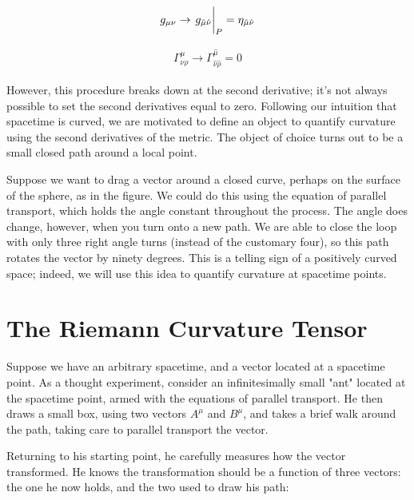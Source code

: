 \documentclass[10pt]{article}
\begin{document}
\begin{align}
    g_{\mu \nu} \rightarrow \eval{g_{\hat{\mu} \hat{\nu}}}_P = \eta_{\hat{\mu}\hat{\nu}}
\end{align}

\begin{align}
    \Gamma^{\mu}_{\nu \rho} \rightarrow \Gamma^{\hat{\mu}}_{\hat{\nu}\hat{\rho}} = 0
\end{align}

However, this procedure breaks down at the second derivative; it's not always possible to set the second derivatives equal to zero. Following our intuition that spacetime is curved, we are motivated to define an object to quantify curvature using the second derivatives of the metric. The object of choice turns out to be a small closed path around a local point.

Suppose we want to drag a vector around a closed curve, perhaps on the surface of the sphere, as in the figure. We could do this using the equation of parallel transport, which holds the angle constant throughout the process. The angle does change, however, when you turn onto a new path. We are able to close the loop with only three right angle turns (instead of the customary four), so this path rotates the vector by ninety degrees. This is a telling sign of a positively curved space; indeed, we will use this idea to quantify curvature at spacetime points.

\section{The Riemann Curvature Tensor}

Suppose we have an arbitrary spacetime, and a vector located at a spacetime point. As a thought experiment, consider an infinitesimally small "ant" located at the spacetime point, armed with the equations of parallel transport. He then draws a small box, using two vectors $A^\mu$ and $B^\mu$, and takes a brief walk around the path, taking care to parallel transport the vector.

Returning to his starting point, he carefully measures how the vector transformed. He knows the transformation should be a function of three vectors: the one he now holds, and the two used to draw his path:
\end{document}

